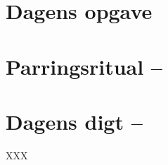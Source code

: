 \begin{minipage}[t]{100mm}
\vspace{3mm}
\section*{Dagens opgave}

\section*{Parringsritual -- }


\section*{Dagens digt -- }
\begin{center}
XXX
\end{center}
\end{minipage}
